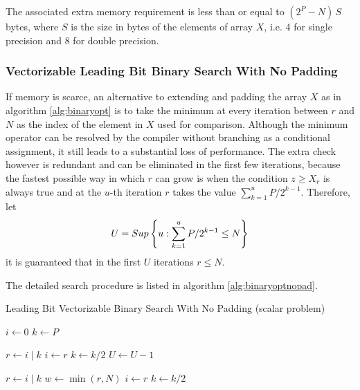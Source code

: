 \documentclass[preprint,1p,times]{elsarticle}
\begin{document}
The associated extra memory requirement is less than or equal to $(2^P-N)\,S$ bytes, where $S$ is the size in bytes of the elements of array $X$, i.e. 4 for single precision and 8 for double precision.

\subsubsection{Vectorizable Leading Bit Binary Search With No Padding}
If memory is scarce, an alternative to extending and padding the array $X$ as in algorithm \ref{alg:binaryopt} is to take the minimum at every iteration between $r$ and $N$ as the index of the element in $X$ used for comparison.
Although the minimum operator can be resolved by the compiler without branching as a conditional assignment, it still leads to a substantial loss of performance. The extra check however is redundant and can be eliminated in the first few iterations, because the fastest possible way in which $r$ can grow is when the condition $z \geq X_r$ is always true and at the $u$-th iteration $r$ takes the value $\sum_{k=1}^u P/ 2^{k-1}$. Therefore, let $$U= Sup \left \{  u: \sum_{k=1}^u P/2^{k-1} \leq N \right \} $$ it is guaranteed that in the first $U$ iterations $r \leq N$.

The detailed search procedure is listed in algorithm \ref{alg:binaryoptnopad}.

\begin{algorithm}[ht]
\caption{Leading Bit Vectorizable Binary Search With No Padding (scalar problem)}
\label{alg:binaryoptnopad}
\begin{algorithmic}
\State $i \leftarrow 0$
\State $k \leftarrow P$

\Repeat
       \State $r \leftarrow i\;|\;k$ 
	   
        	\State $i \leftarrow r$
	\EndIf
	\State $k \leftarrow k/2$  
   \State $U \leftarrow U-1$

    	\State $r \leftarrow i\;|\;k$ 
    	\State $w \leftarrow \min(r,N)$  
        	\State $i \leftarrow r$    
    	\EndIf
	\State $k \leftarrow k / 2$ 
\EndWhile
\EndFunction
\end{algorithmic}
\end{algorithm}
\end{document}
